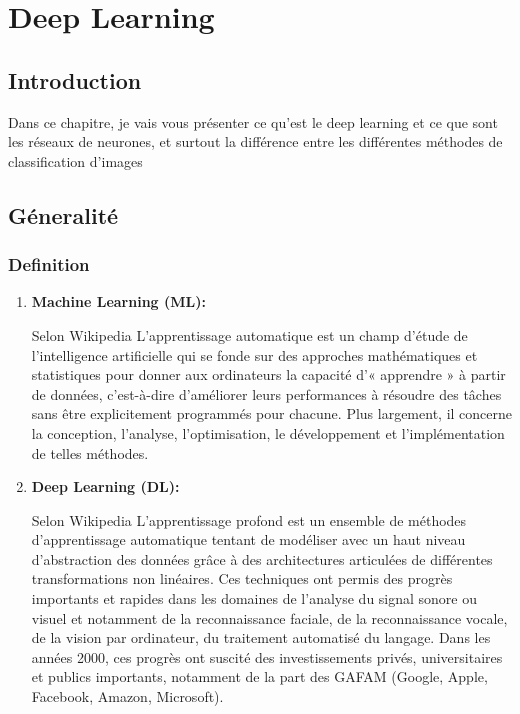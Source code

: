 \chapter{Deep Learning}

\section*{Introduction}
    Dans ce chapitre, je vais vous présenter ce qu'est le deep learning et ce que sont les réseaux de neurones, et surtout la différence entre les différentes méthodes de classification d'images
\section{Géneralité}
    \subsection{Definition}
        \begin{enumerate}
            \item \textbf{Machine Learning (ML):} 
            
            Selon Wikipedia L'apprentissage automatique est un champ d'étude de l'intelligence artificielle qui se fonde sur des approches mathématiques et statistiques pour donner aux ordinateurs la capacité d'« apprendre » à partir de données, c'est-à-dire d'améliorer leurs performances à résoudre des tâches sans être explicitement programmés pour chacune. Plus largement, il concerne la conception, l'analyse, l'optimisation, le développement et l'implémentation de telles méthodes.


            \item \textbf{Deep Learning (DL):} 
            
            Selon Wikipedia L'apprentissage profond est un ensemble de méthodes d'apprentissage automatique tentant de modéliser avec un haut niveau d’abstraction des données grâce à des architectures articulées de différentes transformations non linéaires. Ces techniques ont permis des progrès importants et rapides dans les domaines de l'analyse du signal sonore ou visuel et notamment de la reconnaissance faciale, de la reconnaissance vocale, de la vision par ordinateur, du traitement automatisé du langage. Dans les années 2000, ces progrès ont suscité des investissements privés, universitaires et publics importants, notamment de la part des GAFAM (Google, Apple, Facebook, Amazon, Microsoft).
        \end{enumerate}
